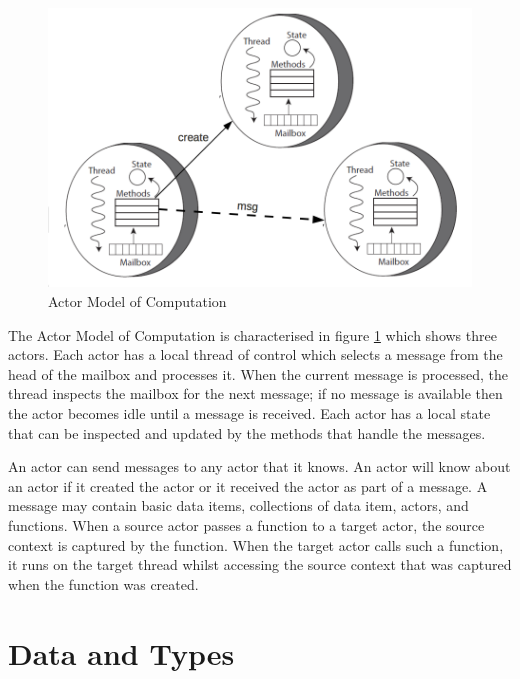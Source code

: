 \documentclass[5p,times]{elsarticle}
\begin{document}
\begin{figure}
\centering
\includegraphics[width=\columnwidth]{actors}
\vspace{-0.20cm}
\caption{Actor Model of Computation \cite{karmani2009actor}}
\label{fig:actors}
\end{figure}

The Actor Model of Computation is characterised in figure \ref{fig:actors} which shows three actors. Each actor has a local thread of control which selects a message from the head of the mailbox and processes it. When the current message is processed, the thread inspects the mailbox for the next message; if no message is available then the actor becomes idle until a message is received. Each actor has a local state that can be inspected and updated by the methods that handle the messages.

An actor can send messages to any actor that it knows. An actor will know about an actor if it created the actor or it received the actor as part of a message. A message may contain basic data items, collections of data item, actors, and functions. When a source actor passes a function to a target actor, the source context is captured by the function. When the target actor calls such a function, it runs on the target thread whilst accessing the source context that was captured when the function was created.





\section{Data and Types}
\end{document}
